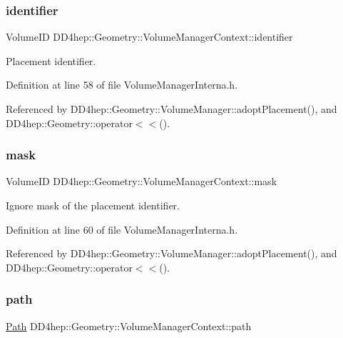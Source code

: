 \subsubsection{\texorpdfstring{identifier}{identifier}}
{\footnotesize\ttfamily Volume\+ID D\+D4hep\+::\+Geometry\+::\+Volume\+Manager\+Context\+::identifier}



Placement identifier. 



Definition at line 58 of file Volume\+Manager\+Interna.\+h.



Referenced by D\+D4hep\+::\+Geometry\+::\+Volume\+Manager\+::adopt\+Placement(), and D\+D4hep\+::\+Geometry\+::operator$<$$<$().

\hypertarget{class_d_d4hep_1_1_geometry_1_1_volume_manager_context_a052bc7df447cef84eabe15a5751e772b}{}\label{class_d_d4hep_1_1_geometry_1_1_volume_manager_context_a052bc7df447cef84eabe15a5751e772b} 
\subsubsection{\texorpdfstring{mask}{mask}}
{\footnotesize\ttfamily Volume\+ID D\+D4hep\+::\+Geometry\+::\+Volume\+Manager\+Context\+::mask}



Ignore mask of the placement identifier. 



Definition at line 60 of file Volume\+Manager\+Interna.\+h.



Referenced by D\+D4hep\+::\+Geometry\+::\+Volume\+Manager\+::adopt\+Placement(), and D\+D4hep\+::\+Geometry\+::operator$<$$<$().

\hypertarget{class_d_d4hep_1_1_geometry_1_1_volume_manager_context_aa29bc3744ae4aff1e6a504c2b758a37c}{}\label{class_d_d4hep_1_1_geometry_1_1_volume_manager_context_aa29bc3744ae4aff1e6a504c2b758a37c} 
\subsubsection{\texorpdfstring{path}{path}}
{\footnotesize\ttfamily \hyperlink{class_d_d4hep_1_1_geometry_1_1_volume_manager_context_a7873b42c6ad25a77d4d7e240286a934c}{Path} D\+D4hep\+::\+Geometry\+::\+Volume\+Manager\+Context\+::path}



